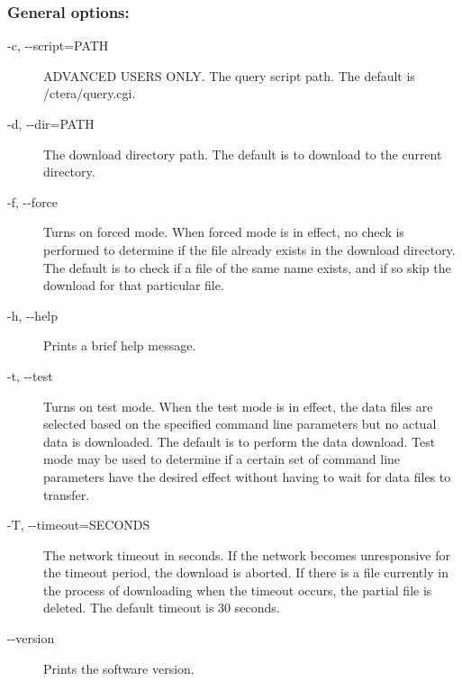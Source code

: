\subsubsection*{General options:}
\begin{description}
\item[ -c, -{-}script=PATH ] ADVANCED USERS ONLY. The query script path. The default is /ctera/query.cgi. 
\item[ -d, -{-}dir=PATH ] The download directory path. The default is to download to the current directory. 
\item[ -f, -{-}force ] Turns on forced mode. When forced mode is in effect, no check is performed to determine if the file already exists in the download directory. The default is to check if a file of the same name exists, and if so skip the download for that particular file. 
\item[ -h, -{-}help ] Prints a brief help message. 
\item[ -t, -{-}test ] Turns on test mode. When the test mode is in effect, the data files are selected based on the specified command line parameters but no actual data is downloaded. The default is to perform the data download. Test mode may be used to determine if a certain set of command line parameters have the desired effect without having to wait for data files to transfer. 
\item[ -T, -{-}timeout=SECONDS ] The network timeout in seconds. If the network becomes unresponsive for the timeout period, the download is aborted. If there is a file currently in the process of downloading when the timeout occurs, the partial file is deleted. The default timeout is 30 seconds. 
\item[-{-}version]Prints the software version.

\end{description}
